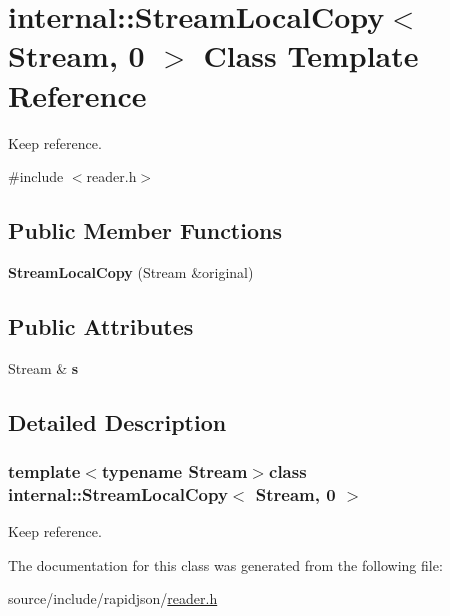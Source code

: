 \hypertarget{classinternal_1_1_stream_local_copy_3_01_stream_00_010_01_4}{}\section{internal\+:\+:Stream\+Local\+Copy$<$ Stream, 0 $>$ Class Template Reference}
\label{classinternal_1_1_stream_local_copy_3_01_stream_00_010_01_4}


Keep reference.  




{\ttfamily \#include $<$reader.\+h$>$}

\subsection*{Public Member Functions}
\begin{DoxyCompactItemize}
\item 
\hypertarget{classinternal_1_1_stream_local_copy_3_01_stream_00_010_01_4_ac684a7be07d79d6ddd274dc1150f4b79}{}{\bfseries Stream\+Local\+Copy} (Stream \&original)\label{classinternal_1_1_stream_local_copy_3_01_stream_00_010_01_4_ac684a7be07d79d6ddd274dc1150f4b79}

\end{DoxyCompactItemize}
\subsection*{Public Attributes}
\begin{DoxyCompactItemize}
\item 
\hypertarget{classinternal_1_1_stream_local_copy_3_01_stream_00_010_01_4_ad31147888384f4bd51eabc2d7acdc4b6}{}Stream \& {\bfseries s}\label{classinternal_1_1_stream_local_copy_3_01_stream_00_010_01_4_ad31147888384f4bd51eabc2d7acdc4b6}

\end{DoxyCompactItemize}


\subsection{Detailed Description}
\subsubsection*{template$<$typename Stream$>$class internal\+::\+Stream\+Local\+Copy$<$ Stream, 0 $>$}

Keep reference. 

The documentation for this class was generated from the following file\+:\begin{DoxyCompactItemize}
\item 
source/include/rapidjson/\hyperlink{reader_8h}{reader.\+h}\end{DoxyCompactItemize}
